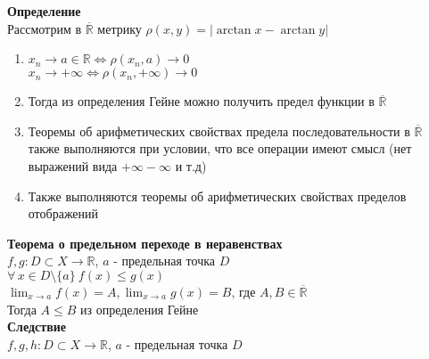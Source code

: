 \documentclass[12pt]{article}
\begin{document}
\textbf{Определение}\\
Рассмотрим в $\overline{\mathbb{R}}$ метрику $\rho(x,y) = |\arctan x - \arctan y|$
\begin{enumerate}
    \item $x_n\rightarrow a \in \mathbb{R} \Leftrightarrow \rho(x_n,a) \rightarrow 0$\\
    $x_n\rightarrow +\infty \Leftrightarrow \rho(x_n,+\infty) \rightarrow 0$
    \item Тогда из определения Гейне можно получить предел функции в $\overline{\mathbb{R}}$
    \item Теоремы об арифметических свойствах предела последовательности в $\overline{\mathbb{R}}$ также выполняются при условии, что все операции имеют смысл (нет выражений вида $+\infty-\infty$ и т.д)
    \item Также выполняются теоремы об арифметических свойствах пределов отображений\\
\end{enumerate}
\textbf{Теорема о предельном переходе в неравенствах}\\
$f,g:D\subset X \rightarrow \mathbb{R}$, $a$ - предельная точка $D$\\
$\forall\,x\in D\setminus\{a\}\ f(x) \leq g(x)$\\
$\lim_{x\rightarrow a} f(x) = A, \lim_{x\rightarrow a} g(x) = B$, где $A,B \in \overline{\mathbb{R}}$\\
Тогда $A\leq B$ из определения Гейне\\
\textbf{Следствие}\\
$f,g,h: D\subset X \rightarrow \mathbb{R}$, $a$ - предельная точка $D$\\
\end{document}
